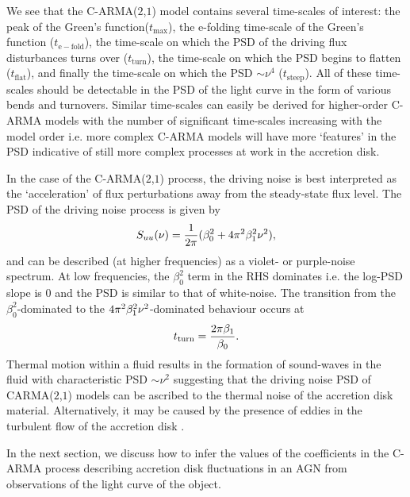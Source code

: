 \documentclass[a4paper,fleqn,usenatbib]{mnras}
\begin{document}
We see that the C-ARMA($2$,$1$) model contains several time-scales of interest: the peak of the Green's function($t_{\mathrm{max}}$), the e-folding time-scale of the Green's function ($t_{\mathrm{e-fold}}$), the time-scale on which the PSD of the driving flux disturbances turns over ($t_{\mathrm{turn}}$), the time-scale on which the PSD begins to flatten ($t_{\mathrm{flat}}$), and finally the time-scale on which the PSD $\sim \nu^{4}$ ($t_{\mathrm{steep}}$). All of these time-scales should be detectable in the PSD of the light curve in the form of various bends and turnovers. Similar time-scales can easily be derived for higher-order C-ARMA models with the number of significant time-scales increasing with the model order i.e. more complex C-ARMA models will have more `features' in the PSD indicative of still more complex processes at work in the accretion disk.

In the case of the C-ARMA($2$,$1$) process, the driving noise is best interpreted as the `acceleration' of flux perturbations away from the steady-state flux level. The PSD of the driving noise process is given by
\begin{equation}\label{eq:CARMA21distPSD}
S_{uu}(\nu) = \frac{1}{2 \pi}(\beta_{0}^{2} + 4 \pi^{2} \beta_{1}^{2} \nu^{2}),
\end{equation}
and can be described (at higher frequencies) as a violet- or purple-noise spectrum. At low frequencies, the $\beta_{0}^{2}$ term in the RHS dominates i.e. the log-PSD slope is $0$ and the PSD is similar to that of white-noise. The transition from the $\beta_{0}^{2}$-dominated to the $4 \pi^{2} \beta_{1}^{2} \nu^{2}$-dominated behaviour occurs at
\begin{equation}\label{eq:distPSDTurnover}
t_{\mathrm{turn}} = \frac{2 \pi \beta_{1}}{\beta_{0}}.
\end{equation}
Thermal motion within a fluid results in the formation of sound-waves in the fluid with characteristic PSD $\sim \nu^{{2}}$ \citep{Mellen52} suggesting that the driving noise PSD of CARMA($2$,$1$) models can be ascribed to the thermal noise of the accretion disk material. Alternatively, it may be caused by the presence of eddies in the turbulent flow of the accretion disk \citep{EddySim15}.

In the next section, we discuss how to infer the values of the coefficients in the C-ARMA process describing accretion disk fluctuations in an AGN from observations of the light curve of the object.

\end{document}

